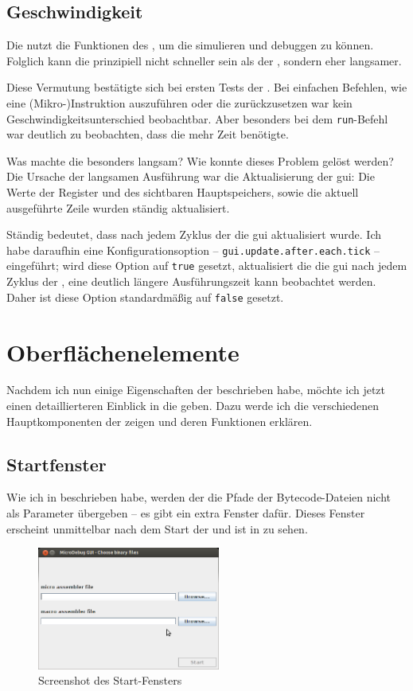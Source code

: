 \subsection{Geschwindigkeit}
Die \mdg nutzt die Funktionen des \md, um die \mic simulieren und debuggen zu können. Folglich kann die \mdg prinzipiell nicht schneller sein als der \md, sondern eher langsamer.

Diese Vermutung bestätigte sich bei ersten Tests der \mdg. Bei einfachen Befehlen, wie eine (Mikro-)Instruktion auszuführen oder die \mic zurückzusetzen war kein Geschwindigkeitsunterschied beobachtbar. Aber besonders bei dem \texttt{run}-Befehl war deutlich zu beobachten, dass die \mdg mehr Zeit benötigte.

Was machte die \mdg besonders langsam? Wie konnte dieses Problem gelöst werden? Die Ursache der langsamen Ausführung war die Aktualisierung der \gls{gui}: Die Werte der Register und des sichtbaren Hauptspeichers, sowie die aktuell ausgeführte Zeile wurden ständig aktualisiert.

Ständig bedeutet, dass nach jedem Zyklus der \mic die \gls{gui} aktualisiert wurde. Ich habe daraufhin eine Konfigurationsoption -- \texttt{gui.update.after.each.tick} -- eingeführt; wird diese Option auf \texttt{true} gesetzt, aktualisiert die \mdg die \gls{gui} nach jedem Zyklus der \mic, eine deutlich längere Ausführungszeit kann beobachtet werden. Daher ist diese Option standardmäßig auf \texttt{false} gesetzt.

\section{Oberflächenelemente}
Nachdem ich nun einige Eigenschaften der \mdg beschrieben habe, möchte ich jetzt einen detaillierteren Einblick in die \mdg geben. Dazu werde ich die verschiedenen Hauptkomponenten der \mdg zeigen und deren Funktionen erklären.

\subsection{Startfenster}
Wie ich in  beschrieben habe, werden der \mdg die Pfade der Bytecode-Dateien nicht als Parameter übergeben -- es gibt ein extra Fenster dafür. Dieses Fenster erscheint unmittelbar nach dem Start der \mdg und ist in  zu sehen.

\begin{figure}[h]
	\centering
	\includegraphics[width=6cm]{images/start-frame-empty}
	\caption{Screenshot des Start-Fensters}
\end{figure}

